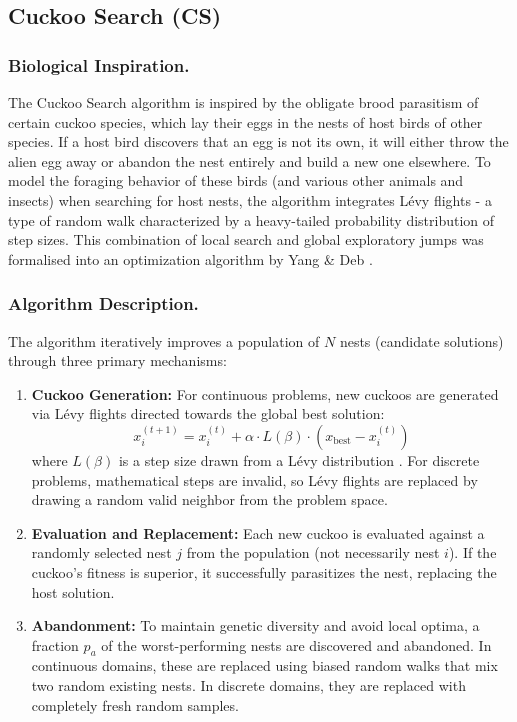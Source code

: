 
\subsection{Cuckoo Search (CS)}

\subsubsection{Biological Inspiration.}
The Cuckoo Search algorithm is inspired by the obligate brood parasitism of certain cuckoo species, which lay their eggs in the nests of host birds of other species. If a host bird discovers that an egg is not its own, it will either throw the alien egg away or abandon the nest entirely and build a new one elsewhere. To model the foraging behavior of these birds (and various other animals and insects) when searching for host nests, the algorithm integrates Lévy flights - a type of random walk characterized by a heavy-tailed probability distribution of step sizes. This combination of local search and global exploratory jumps was formalised into an optimization algorithm by Yang \& Deb \autocite{YangDeb2009}.

\subsubsection{Algorithm Description.}
The algorithm iteratively improves a population of $N$ nests (candidate solutions) through three primary mechanisms:
\begin{enumerate}
    \item \textbf{Cuckoo Generation:} For continuous problems, new cuckoos are generated via Lévy flights directed towards the global best solution: 
    $$x_i^{(t+1)} = x_i^{(t)} + \alpha \cdot L(\beta) \cdot (x_{\text{best}} - x_i^{(t)})$$
    where $L(\beta)$ is a step size drawn from a Lévy distribution \autocite{YangDeb2009,YangDeb2014Cuckoo}. For discrete problems, mathematical steps are invalid, so Lévy flights are replaced by drawing a random valid neighbor from the problem space.
    \item \textbf{Evaluation and Replacement:} Each new cuckoo is evaluated against a randomly selected nest $j$ from the population (not necessarily nest $i$). If the cuckoo's fitness is superior, it successfully parasitizes the nest, replacing the host solution.
    \item \textbf{Abandonment:} To maintain genetic diversity and avoid local optima, a fraction $p_a$ of the worst-performing nests are discovered and abandoned. In continuous domains, these are replaced using biased random walks that mix two random existing nests. In discrete domains, they are replaced with completely fresh random samples.
\end{enumerate}

